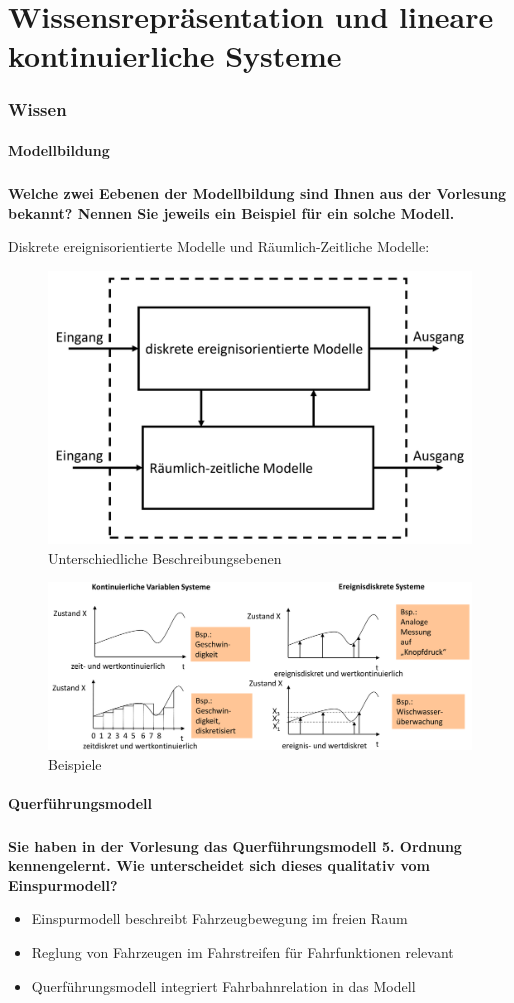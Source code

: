 \part{Wissensrepräsentation und lineare kontinuierliche Systeme}
\section{Wissen}
\subsection{Modellbildung}
\subsubsection{}
\textbf{Welche zwei Eebenen der Modellbildung sind Ihnen aus der Vorlesung bekannt? Nennen Sie jeweils ein Beispiel für ein solche Modell.}

Diskrete ereignisorientierte Modelle und Räumlich-Zeitliche Modelle:
\begin{figure}[H]
    \centering
    \includegraphics[width=.4\linewidth]{Graphics/Modellbildung_Ebenen.png}
    \caption{Unterschiedliche Beschreibungsebenen}
\end{figure}
\begin{figure}
    \centering
    \includegraphics[width=.6\linewidth]{Graphics/Beispiel_Modell.png}
    \caption{Beispiele}
\end{figure}

\subsection{Querführungsmodell}
\subsubsection{}
\textbf{Sie haben in der Vorlesung das Querführungsmodell 5. Ordnung kennengelernt. Wie unterscheidet sich dieses qualitativ vom Einspurmodell?}
\begin{itemize}
    \item Einspurmodell beschreibt Fahrzeugbewegung im freien Raum
    \item Reglung von Fahrzeugen im Fahrstreifen für Fahrfunktionen relevant
    \item Querführungsmodell integriert Fahrbahnrelation in das Modell
\end{itemize}

